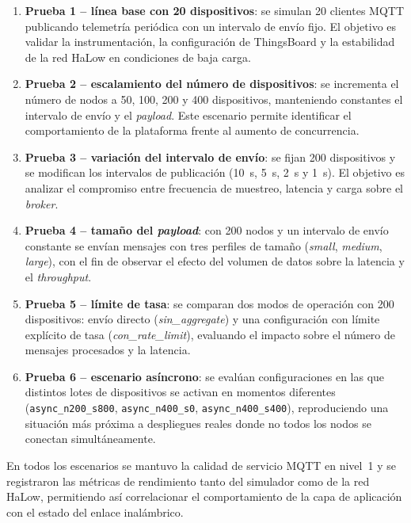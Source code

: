 \begin{enumerate}
  \item \textbf{Prueba 1 -- l\'inea base con 20 dispositivos}: se simulan \num{20} clientes MQTT publicando telemetr\'ia peri\'odica con un intervalo de env\'io fijo. El objetivo es validar la instrumentaci\'on, la configuraci\'on de ThingsBoard y la estabilidad de la red HaLow en condiciones de baja carga.
  \item \textbf{Prueba 2 -- escalamiento del n\'umero de dispositivos}: se incrementa el n\'umero de nodos a \num{50}, \num{100}, \num{200} y \num{400} dispositivos, manteniendo constantes el intervalo de env\'io y el \emph{payload}. Este escenario permite identificar el comportamiento de la plataforma frente al aumento de concurrencia.
  \item \textbf{Prueba 3 -- variaci\'on del intervalo de env\'io}: se fijan \num{200} dispositivos y se modifican los intervalos de publicaci\'on (\SI{10}{\second}, \SI{5}{\second}, \SI{2}{\second} y \SI{1}{\second}). El objetivo es analizar el compromiso entre frecuencia de muestreo, latencia y carga sobre el \emph{broker}.
  \item \textbf{Prueba 4 -- tama\~no del \emph{payload}}: con \num{200} nodos y un intervalo de env\'io constante se env\'ian mensajes con tres perfiles de tama\~no (\textit{small}, \textit{medium}, \textit{large}), con el fin de observar el efecto del volumen de datos sobre la latencia y el \emph{throughput}.
  \item \textbf{Prueba 5 -- l\'imite de tasa}: se comparan dos modos de operaci\'on con \num{200} dispositivos: env\'io directo (\textit{sin\_aggregate}) y una configuraci\'on con l\'imite expl\'icito de tasa (\textit{con\_rate\_limit}), evaluando el impacto sobre el n\'umero de mensajes procesados y la latencia.
  \item \textbf{Prueba 6 -- escenario as\'incrono}: se eval\'uan configuraciones en las que distintos lotes de dispositivos se activan en momentos diferentes (\texttt{async\_n200\_s800}, \texttt{async\_n400\_s0}, \texttt{async\_n400\_s400}), reproduciendo una situaci\'on m\'as pr\'oxima a despliegues reales donde no todos los nodos se conectan simult\'aneamente.
\end{enumerate}

En todos los escenarios se mantuvo la calidad de servicio MQTT en nivel~1 y se registraron las m\'etricas de rendimiento tanto del simulador como de la red HaLow, permitiendo as\'i correlacionar el comportamiento de la capa de aplicaci\'on con el estado del enlace inal\'ambrico.
